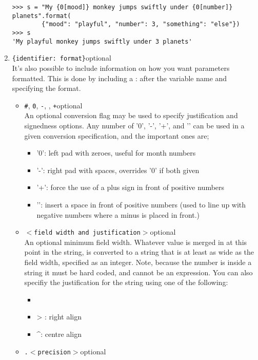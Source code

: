 \begin{enumerate}
\begin{lstlisting}
>>> s = "My {0[mood]} monkey jumps swiftly under {0[number]} planets".format(
        {"mood": "playful", "number": 3, "something": "else"})
>>> s
'My playful monkey jumps swiftly under 3 planets'
\end{lstlisting}
	\item 
\texttt{\{identifier: format\}}\nolinebreak*optional
\\       It's also possible to include information on how you want parameters formatted.       This is done by including a : after the variable name and specifying the format.        
\begin{itemize}
	\item 
\texttt{\#}, 
\texttt{0}, 
\texttt{-},    
\texttt{\nolinebreak}, 
\texttt{+}\nolinebreak*optional
\\        An optional conversion flag may be used to specify justification    and signedness options. Any number of '0', '-', '+', and '\nolinebreak'    can be used in a given conversion specification, and the important    ones are;      
\begin{itemize}
	\item '0': left pad with zeroes, useful for month      numbers
	\item '-': right pad with spaces, overrides '0' if both      given
	\item '+': force the use of a plus sign in front of positive      numbers
	\item '\nolinebreak': insert a space in front of positive numbers      (used to line up with negative numbers where a minus is      placed in front.)
\end{itemize}
	\item 
\texttt{$<$field width and justification$>$}\nolinebreak*optional
\\     An optional minimum field width. Whatever value is merged in at    this point in the string, is converted to a string that is at least    as wide as the field width, specified as an integer. Note, because    the number is inside a string it must be hard coded, and cannot be    an expression. You can also specifiy the justification for the string using       one of the following:
\begin{itemize}
	\item 
	\item > : right align 
	\item \textasciicircum : centre align
\end{itemize}
	\item 
\texttt{.$<$precision$>$}\nolinebreak*optional

\end{itemize}
\end{enumerate}
